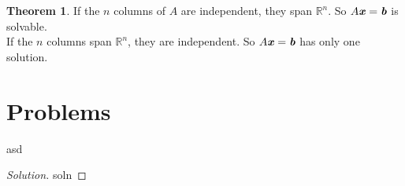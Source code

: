 \documentclass[12pt, letterpaper]{article}
\newcommand{\R}[1]{$\mathbb{R}^{#1}$}
\newcommand{\V}[1]{\textbf{\textit{#1}}}
\newcommand{\DefinitionSpace}{\vspace{15px}}
\theoremstyle{definition}
\newtheorem{theorem}{Theorem}
\newenvironment{problem}[2][Problem]{\begin{trivlist}
		\item[\hskip \labelsep {\bfseries #1}\hskip \labelsep {\bfseries #2.}]}{\end{trivlist}}
\begin{document}
	\begin{theorem}
		If the $n$ columns of $A$ are independent, they span \R{n}. So $A\V{x} = \V{b}$ is solvable.\\
		If the $n$ columns span \R{n}, they are independent. So $A\V{x} = \V{b}$ has only one solution.
	\end{theorem}\DefinitionSpace 
	
	
	
	
\section{Problems}


	\begin{problem}{1.1}
		asd
	\end{problem}
	
	\begin{proof}[Solution]
		soln
	\end{proof}
	
	
	
	
	
	
	
\end{document}
